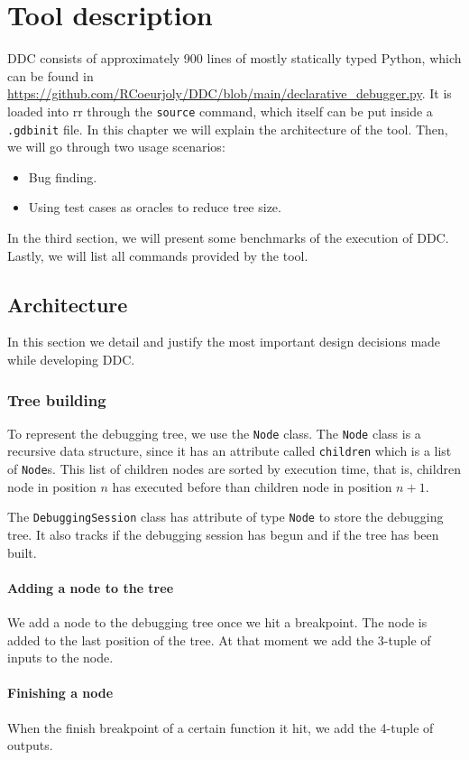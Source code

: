 \chapter{Tool description}
\label{cap:toolDescription}
DDC consists of approximately 900 lines of mostly statically typed Python, which can be found in \url{https://github.com/RCoeurjoly/DDC/blob/main/declarative_debugger.py}.
%
It is loaded into rr through the \verb|source| command, which itself can be put inside a \verb|.gdbinit| file.
%
In this chapter we will explain the architecture of the tool.
Then, we will go through two usage scenarios:
\begin{itemize}
    \item Bug finding.
    \item Using test cases as oracles to reduce tree size.
\end{itemize}
In the third section, we will present some benchmarks of the execution of DDC.
Lastly, we will list all commands provided by the tool.

\section{Architecture}
In this section we detail and justify the most important design decisions made while developing DDC.
\subsection{Tree building}
To represent the debugging tree, we use the \verb|Node| class. The \verb|Node| class is a recursive data structure, since it has an attribute called \verb|children| which is a list of \verb|Node|s. This list of children nodes are sorted by execution time, that is, children node in position \(n\) has executed before than children node in position \(n+1\).

The \verb|DebuggingSession| class has attribute of type \verb|Node| to store the debugging tree. It also tracks if the debugging session has begun and if the tree has been built.

\subsubsection{Adding a node to the tree}
We add a node to the debugging tree once we hit a breakpoint.
The node is added to the last position of the tree.
At that moment we add the 3-tuple of inputs to the node.
\subsubsection{Finishing a node}
When the finish breakpoint of a certain function it hit, we add the 4-tuple of outputs.
